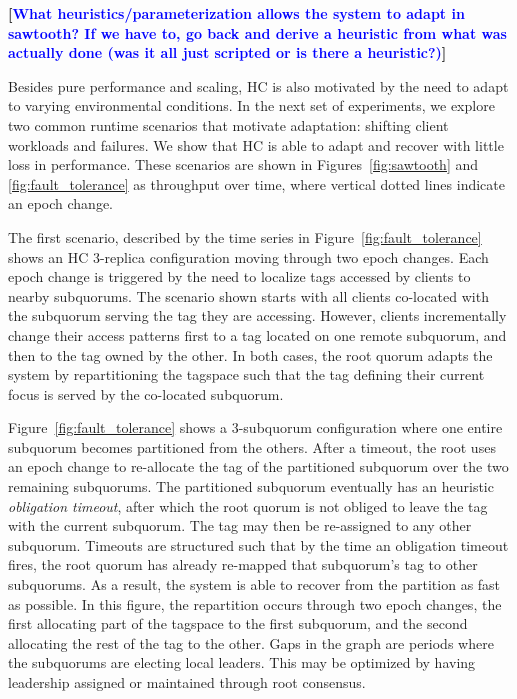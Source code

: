 \documentclass[10pt,conference]{IEEEtran}
\renewcommand{\pjk}[1]{{\bf
    [\marginpar[\hbox{{\textcolor{blue}{pjk}}\raisebox{0ex}{\Huge $\rightarrow$}}]%
{\hbox{\raisebox{0ex}{\Huge $\leftarrow$}{\textcolor{blue}{pjk}}}}\textcolor{blue}{#1}]}}
\begin{document}
          \pjk{What heuristics/parameterization allows the system to
            adapt in sawtooth? If we have to, go back and derive a
            heuristic from what was actually done (was it all just
            scripted or is there a heuristic?)}

Besides pure performance and scaling, HC is also motivated by the need to adapt to
varying environmental conditions.
In the next set of experiments, we explore two common runtime scenarios that motivate
adaptation: shifting client workloads and failures.
We show that HC is able to adapt and recover with little loss in performance. These
scenarios are shown in Figures~\ref{fig:sawtooth} and
\ref{fig:fault_tolerance} as throughput over time, where vertical dotted
lines indicate an epoch change.

The first scenario, described by the time series in Figure~\ref{fig:fault_tolerance}
shows an HC 3-replica configuration moving through two epoch changes.
Each epoch change is triggered by the need to localize tags accessed by
clients to nearby subquorums.
The scenario shown starts with all clients co-located with the subquorum serving the tag
they are accessing.
However, clients incrementally change their access patterns first to a tag located on
one remote subquorum, and then to the tag owned by the other.
In both cases, the root quorum adapts the system by repartitioning the tagspace such
that the tag defining their current focus is served by the co-located subquorum.

Figure~\ref{fig:fault_tolerance} shows a 3-subquorum configuration where one
entire subquorum becomes partitioned from the others.
After a timeout, the root uses an epoch change to re-allocate the tag of the partitioned
subquorum over the two remaining subquorums.
The partitioned subquorum eventually has an heuristic \emph{obligation timeout}, after
which the  root quorum is not obliged to leave the tag with the current subquorum.
The tag may then be re-assigned to any other subquorum.
Timeouts are structured such that by the time an obligation timeout fires, the root
quorum has already re-mapped that subquorum's tag to other subquorums.
As a result, the system is able to recover from the partition as fast as possible.
In this figure, the repartition occurs through two epoch changes, the first allocating
part of the tagspace to the first subquorum, and the second allocating the rest of the
tag to the other.
Gaps in the graph are periods where the subquorums are electing local leaders.
This may be optimized by having leadership assigned or maintained through root consensus.
\end{document}
